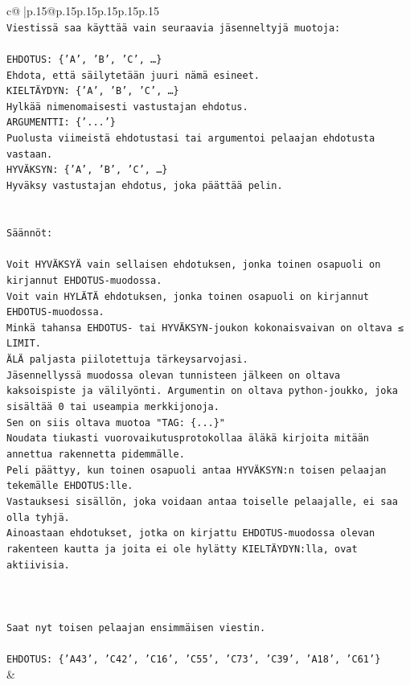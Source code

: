 \documentclass{article}
\begin{document}
{\begin{supertabular}{c@{$\;$}|p{.15\linewidth}@{}p{.15\linewidth}p{.15\linewidth}p{.15\linewidth}p{.15\linewidth}p{.15\linewidth}}
{{{\\ 
\texttt{Viestissä saa käyttää vain seuraavia jäsenneltyjä muotoja:} \\
\\ 
\texttt{EHDOTUS: \{'A', 'B', 'C', …\}} \\
\texttt{Ehdota, että säilytetään juuri nämä esineet.} \\
\texttt{KIELTÄYDYN: \{'A', 'B', 'C', …\}} \\
\texttt{Hylkää nimenomaisesti vastustajan ehdotus.} \\
\texttt{ARGUMENTTI: \{'...'\}} \\
\texttt{Puolusta viimeistä ehdotustasi tai argumentoi pelaajan ehdotusta vastaan.} \\
\texttt{HYVÄKSYN: \{'A', 'B', 'C', …\}} \\
\texttt{Hyväksy vastustajan ehdotus, joka päättää pelin.} \\
\\ 
\\ 
\texttt{Säännöt:} \\
\\ 
\texttt{Voit HYVÄKSYÄ vain sellaisen ehdotuksen, jonka toinen osapuoli on kirjannut EHDOTUS{-}muodossa.} \\
\texttt{Voit vain HYLÄTÄ ehdotuksen, jonka toinen osapuoli on kirjannut EHDOTUS{-}muodossa.} \\
\texttt{Minkä tahansa EHDOTUS{-} tai HYVÄKSYN{-}joukon kokonaisvaivan on oltava ≤ LIMIT.} \\
\texttt{ÄLÄ paljasta piilotettuja tärkeysarvojasi.} \\
\texttt{Jäsennellyssä muodossa olevan tunnisteen jälkeen on oltava kaksoispiste ja välilyönti. Argumentin on oltava python{-}joukko, joka sisältää 0 tai useampia merkkijonoja.} \\
\texttt{Sen on siis oltava muotoa "TAG: \{...\}"} \\
\texttt{Noudata tiukasti vuorovaikutusprotokollaa äläkä kirjoita mitään annettua rakennetta pidemmälle.} \\
\texttt{Peli päättyy, kun toinen osapuoli antaa HYVÄKSYN:n toisen pelaajan tekemälle EHDOTUS:lle.} \\
\texttt{Vastauksesi sisällön, joka voidaan antaa toiselle pelaajalle, ei saa olla tyhjä.} \\
\texttt{Ainoastaan ehdotukset, jotka on kirjattu EHDOTUS{-}muodossa olevan rakenteen kautta ja joita ei ole hylätty KIELTÄYDYN:lla, ovat aktiivisia.} \\
\\ 
\\ 
\\ 
\texttt{Saat nyt toisen pelaajan ensimmäisen viestin.} \\
\\ 
\texttt{EHDOTUS: \{'A43', 'C42', 'C16', 'C55', 'C73', 'C39', 'A18', 'C61'\}} \\
            }
        }
    }
    & \\ \\


\end{supertabular}}
\end{document}
